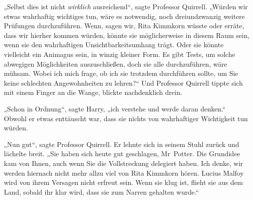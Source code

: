 „Selbst dies ist nicht \emph{wirklich} ausreichend“, sagte Professor Quirrell. „Würden wir etwas wahrhaftig wichtiges tun, wäre es notwendig, noch dreiundzwanzig weitere Prüfungen durchzuführen. Wenn, sagen wir, Rita Kimmkorn wüsste oder erräte, dass wir hierher kommen würden, könnte sie möglicherweise in diesem Raum sein, wenn sie den wahrhaftigen Unsichtbarkeitsumhang trägt. Oder sie könnte vielleicht ein Animagus sein, in winzig kleiner Form. Es gibt Tests, um solche abwegigen Möglichkeiten auszuschließen, doch sie alle durchzuführen, wäre mühsam. Wobei ich mich frage, ob ich sie trotzdem durchführen sollte, um Sie keine schlechten Angewohnheiten zu lehren?“ Und Professor Quirrell tippte sich mit einem Finger an die Wange, blickte nachdenklich drein.

„Schon in Ordnung“, sagte Harry, „ich verstehe und werde daran denken.“ Obwohl er etwas enttäuscht war, dass sie nichts von wahrhaftiger Wichtigkeit tun würden.

„Nun gut“, sagte Professor Quirrell. Er lehnte sich in seinem Stuhl zurück und lächelte breit. „Sie haben sich heute gut geschlagen, Mr~Potter. Die Grundidee kam von Ihnen, auch wenn Sie die Vollstreckung delegiert haben. Ich denke, wir werden hiernach nicht mehr allzu viel von Rita Kimmkorn hören. Lucius Malfoy wird von ihrem Versagen nicht erfreut sein. Wenn sie klug ist, flieht sie aus dem Land, sobald ihr klar wird, dass sie zum Narren gehalten wurde.“

